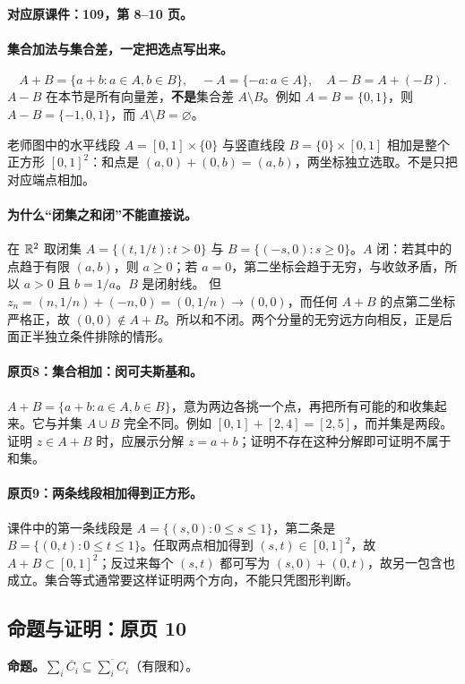 \textbf{对应原课件：109，第 8--10 页。}


\paragraph{集合加法与集合差，一定把选点写出来。}
\[A+B=\{a+b:a\in A,b\in B\},\quad -A=\{-a:a\in A\},\quad A-B=A+(-B).
\]
$A-B$ 在本节是所有向量差，\textbf{不是}集合差 $A\setminus B$。例如 $A=B=\{0,1\}$，则 $A-B=\{-1,0,1\}$，而 $A\setminus B=\varnothing$。

老师图中的水平线段 $A=[0,1]\times\{0\}$ 与竖直线段 $B=\{0\}\times[0,1]$ 相加是整个正方形 $[0,1]^2$：和点是 $(a,0)+(0,b)=(a,b)$，两坐标独立选取。不是只把对应端点相加。
\paragraph{为什么“闭集之和闭”不能直接说。}
在 $\mathbb{R}^2$ 取闭集 $A=\{(t,1/t):t>0\}$ 与 $B=\{(-s,0):s\ge0\}$。$A$ 闭：若其中的点趋于有限 $(a,b)$，则 $a\ge0$；若 $a=0$，第二坐标会趋于无穷，与收敛矛盾，所以 $a>0$ 且 $b=1/a$。$B$ 是闭射线。
但 $z_n=(n,1/n)+(-n,0)=(0,1/n)\to(0,0)$，而任何 $A+B$ 的点第二坐标严格正，故 $(0,0)\notin A+B$。所以和不闭。两个分量的无穷远方向相反，正是后面正半独立条件排除的情形。


\paragraph{原页8：集合相加：闵可夫斯基和。}$A+B=\{a+b:a\in A,b\in B\}$，意为两边各挑一个点，再把所有可能的和收集起来。它与并集 $A\cup B$ 完全不同。例如 $[0,1]+[2,4]=[2,5]$，而并集是两段。证明 $z\in A+B$ 时，应展示分解 $z=a+b$；证明不存在这种分解即可证明不属于和集。



\paragraph{原页9：两条线段相加得到正方形。}课件中的第一条线段是 $A=\{(s,0):0\le s\le1\}$，第二条是 $B=\{(0,t):0\le t\le1\}$。任取两点相加得到 $(s,t)\in[0,1]^2$，故 $A+B\subset[0,1]^2$；反过来每个 $(s,t)$ 都可写为 $(s,0)+(0,t)$，故另一包含也成立。集合等式通常要这样证明两个方向，不能只凭图形判断。



\subsection{命题与证明：原页 10}

\textbf{命题。}$\sum_i\overline{C_i}\subseteq\overline{\sum_i C_i}$（有限和）。

